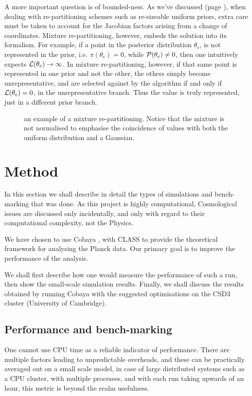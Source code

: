 \documentclass[usenatbib]{mnras}
\begin{document}
A more important question is of bounded-ness. As we've discussed
(page \pageref{domain-discussion}), when dealing with re-partitioning
schemes such as re-sizeable uniform priors, extra care must be
taken to account for the Jacobian factors arising from a change of
coordinates. Mixture re-partitioning, however, embeds the solution
into its formalism. For example, if a point in the posterior
distribution \(\theta_{e}\), is not represented in the prior, i.e.
\(\pi(\theta_{e}) = 0\), while \({\cal P}(\theta_{e}) \ne 0\), then
one intuitively expects \({\cal L}(\theta_{e}) \rightarrow
	\infty\). In mixture re-partitioning, however, if that same point is
represented in one prior and not the other, the others simply
become unrepresentative, and are selected against by the algorithm
if and only if \({\cal L}(\theta_{e}) = 0\), in the unrepresentative
branch. Thus the value is truly represented, just in a different
prior branch.

\begin{figure}
 
\caption{\label{org314c010}
an example of a mixture re-partitioning. Notice that the mixture is not normalised to emphasise the coincidence of values with both the uniform distribution and a Gaussian.}
\end{figure}



\section{Method}
\label{sec:orge9a9feb}
In this section we shall describe in detail the types of simulations
and bench-marking that was done. As this project is highly
computational, Cosmological issues are discussed only incidentally,
and only with regard to their computational complexity, not the
Physics.

We have chosen to use Cobaya \citep{cobaya}, with CLASS to provide the
theoretical framework for analysing the Planck \citep{planck}
data. Our primary goal is to improve the performance of the
analysis.

We shall first describe how one would measure the performance of
such a run, then show the small-scale simulation results. Finally,
we shall discuss the results obtained by running Cobaya with the
suggested optimisations on the CSD3 cluster (University of Cambridge).


\subsection{Performance and bench-marking}
\label{sec:org17a2214}
One cannot use CPU time as a reliable indicator of
performance. There are multiple factors leading to unpredictable
overheads, and these can be practically averaged out on a small
scale model, in case of large distributed systems such as a CPU
cluster, with multiple processes, and with each run taking upwards
of an hour, this metric is beyond the realm usefulness.
\end{document}
